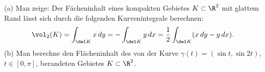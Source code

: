         \begin{prob}
%
(a) Man zeige: Der F\"acheninhalt eines kompakten Gebietes $K\subset\R^2$ mit glattem Rand l\"asst sich durch die folgenden Kurvenintegrale berechnen:
$$
\vol_2(K) = \int_{\del K}x\,dy = -\int_{\del K}y\,dx = \frac12\int_{\del K}(x\,dy-y\,dx).
$$
(b) Man berechne den Fl\"acheninhalt des von der Kurve $\gamma(t)=(\sin
t,\sin 2t)$, $t\in[0,\pi]$, berandeten Gebietes $K\subset\R^2$. 
\vspace{2mm}
        \end{prob}
